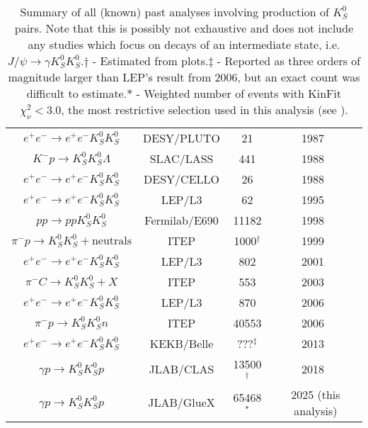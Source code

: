 \begin{table}
\begin{center}
\begin{tabular}{cccc}
      $e^+e^- \to e^+e^- K_S^0 K_S^0$ & DESY/PLUTO & 21 & 1987~\cite{berger_tensor_1988}\\
      $K^- p \to K_S^0 K_S^0 \Lambda$ & SLAC/LASS & 441 & 1988~\cite{aston_study_1988}\\
      $e^+e^- \to e^+e^- K_S^0 K_S^0$ & DESY/CELLO & 26 & 1988~\cite{behrend_theks0ks0final_1989}\\
      $e^+e^- \to e^+e^- K_S^0 K_S^0$ & LEP/L3 & 62 & 1995~\cite{acciarri_study_1995}\\
      $pp \to pp K_S^0 K_S^0$ & Fermilab/E690 & 11182 & 1998~\cite{reyes_partial_1998}\\
      $\pi^- p \to K_S^0 K_S^0 + \text{neutrals}$ & ITEP & 1000${}^\dagger$ & 1999~\cite{barkov_discovery_1999}\\
      $e^+e^- \to e^+e^- K_S^0 K_S^0$ & LEP/L3 & 802 & 2001~\cite{acciarri_k_s0k_s0_2001}\\
      $\pi^- C \to K_S^0 K_S^0 + X$ & ITEP & 553 & 2003~\cite{tikhomirov_resonances_2003}\\
      $e^+e^- \to e^+e^- K_S^0 K_S^0$ & LEP/L3 & 870 & 2006~\cite{schegelsky_k0_2006}\\
      $\pi^- p \to K_S^0 K_S^0 n$ & ITEP & 40553 & 2006~\cite{vladimirsky_analysis_2006}\\
      $e^+e^- \to e^+e^- K_S^0 K_S^0$ & KEKB/Belle & ???${}^\ddagger$ & 2013~\cite{uehara_high-statistics_2013}\\
      $\gamma p \to K_S^0 K_S^0 p$ & JLAB/CLAS & 13500${}^\dagger$ & 2018~\cite{the_clas_collaboration_double_2018}\\
      $\gamma p \to K_S^0 K_S^0 p$ & JLAB/GlueX & 65468${}^\ast$ & 2025 (this analysis)\\\bottomrule
    \end{tabular}
    \caption{Summary of all (known) past analyses involving production of $K_S^0$ pairs. Note that this is possibly not exhaustive and does not include any studies which focus on decays of an intermediate state, i.e. $J/\psi \to \gamma K_S^0K_S^0$.\newline$\dagger$ - Estimated from plots.\newline$\ddagger$ - Reported as three orders of magnitude larger than LEP's result from 2006, but an exact count was difficult to estimate.\newline$\ast$ - Weighted number of events with KinFit $\chi^2_\nu < 3.0$, the most restrictive selection used in this analysis (see ).}\label{tab:past-analyses}
  \end{center}
\end{table}
